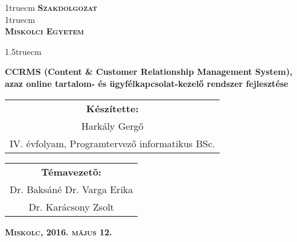 \pagestyle{empty} %

{\large
\begin{center}
\vglue 1truecm
\textbf{\huge\textsc{Szakdolgozat}}\\
\vglue 1truecm
\\
\textbf{\textsc{Miskolci Egyetem}}
\end{center}}

\vglue 1.5truecm %

{\LARGE
\begin{center}
\textbf{CCRMS (Content \& Customer Relationship Management System), azaz online tartalom- és ügyfélkapcsolat-kezelő rendszer fejlesztése}
\end{center}}

\vspace*{2.5truecm}
{\large
\begin{center}
\begin{tabular}{c}
\textbf{Készítette:}\\
Harkály Gergő\\
IV. évfolyam, Programtervező informatikus BSc.
\end{tabular}
\end{center}
\begin{center}
\begin{tabular}{c}
\textbf{Témavezetõ:}\\
Dr. Baksáné Dr. Varga Erika\\
Dr. Karácsony Zsolt
\end{tabular}
\end{center}}
\vfill
{\large
\begin{center}
\textbf{\textsc{Miskolc, 2016. május 12.}}
\end{center}}

\newpage
